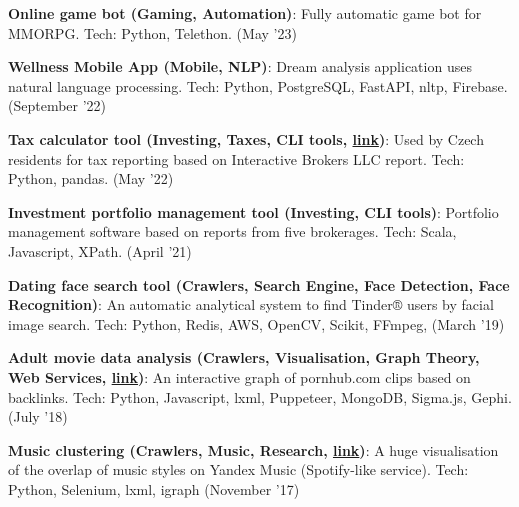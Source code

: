 \documentclass[a4paper,20pt]{article}
\newcommand{\resumeItem}[2]{
  \item\small{
    \textbf{#1}{: #2 \vspace{-2pt}}
  }
}
\newcommand{\resumeSubItem}[2]{\resumeItem{#1}{#2}\vspace{-3pt}}
\newcommand{\padding}{\vspace{2pt}}
\begin{document}
    \resumeSubItem{Online game bot (Gaming, Automation)}{Fully automatic game bot for MMORPG. Tech: Python, Telethon. (May '23)}
    \padding

    \resumeSubItem{Wellness Mobile App (Mobile, NLP)}{Dream analysis application uses natural language processing. Tech: Python, PostgreSQL, FastAPI, nltp, Firebase. (September '22)}
    \padding

    \resumeSubItem{Tax calculator tool (Investing, Taxes, CLI tools, \href{https://github.com/esemi/investments/tree/devel\#investments}{link})}{Used by Czech residents for tax reporting based on Interactive Brokers LLC report. Tech: Python, pandas. (May '22)}
    \padding

    \resumeSubItem{Investment portfolio management tool (Investing, CLI tools)}{Portfolio management software based on reports from five brokerages. Tech: Scala, Javascript, XPath. (April '21)}
    \padding


    \resumeSubItem{Dating face search tool (Crawlers, Search Engine, Face Detection, Face Recognition)}{An automatic analytical system to find Tinder® users by facial image search. Tech: Python, Redis, AWS, OpenCV, Scikit, FFmpeg, (March '19)}
    \padding

    \resumeSubItem{Adult movie data analysis (Crawlers, Visualisation, Graph Theory, Web Services, \href{https://esemi.github.io/pornhub-graph/}{link})}{An interactive graph of pornhub.com clips based on backlinks. Tech: Python, Javascript, lxml, Puppeteer, MongoDB, Sigma.js, Gephi. (July '18)}
    \padding

    \resumeSubItem{Music clustering (Crawlers, Music, Research, \href{https://habr.com/ru/company/semrush/blog/337216/}{link})}{A huge visualisation of the overlap of music styles on Yandex Music (Spotify-like service). Tech: Python, Selenium, lxml, igraph (November '17)}
    \padding

\end{document}
